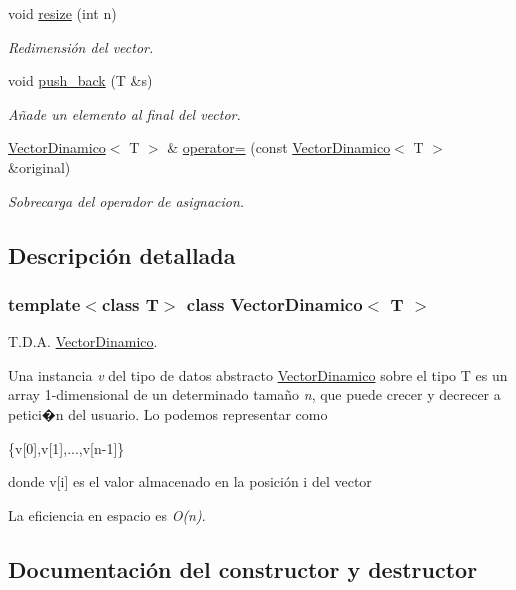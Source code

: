 \begin{DoxyCompactItemize}
void \hyperlink{classVectorDinamico_a9b3fd8907bc3ca9b5bc5775bbb11f867}{resize} (int n)
\begin{DoxyCompactList}\small\item\em Redimensión del vector. \end{DoxyCompactList}\item 
void \hyperlink{classVectorDinamico_a2680351f2cd4feba8825c6f1f04a6392}{push\+\_\+back} (T \&s)
\begin{DoxyCompactList}\small\item\em Añade un elemento al final del vector. \end{DoxyCompactList}\item 
\hyperlink{classVectorDinamico}{Vector\+Dinamico}$<$ T $>$ \& \hyperlink{classVectorDinamico_a94727e698cadc2cf3e8482ce9620df87}{operator=} (const \hyperlink{classVectorDinamico}{Vector\+Dinamico}$<$ T $>$ \&original)
\begin{DoxyCompactList}\small\item\em Sobrecarga del operador de asignacion. \end{DoxyCompactList}\end{DoxyCompactItemize}


\subsection{Descripción detallada}
\subsubsection*{template$<$class T$>$\newline
class Vector\+Dinamico$<$ T $>$}

T.\+D.\+A. \hyperlink{classVectorDinamico}{Vector\+Dinamico}. 

Una instancia {\itshape v} del tipo de datos abstracto {\ttfamily \hyperlink{classVectorDinamico}{Vector\+Dinamico}} sobre el tipo {\ttfamily T} es un array 1-\/dimensional de un determinado tamaño {\itshape n}, que puede crecer y decrecer a petici�n del usuario. Lo podemos representar como

\{v\mbox{[}0\mbox{]},v\mbox{[}1\mbox{]},...,v\mbox{[}n-\/1\mbox{]}\}

donde v\mbox{[}i\mbox{]} es el valor almacenado en la posición i del vector

La eficiencia en espacio es {\itshape O(n)}. 

\subsection{Documentación del constructor y destructor}
\mbox{\label{classVectorDinamico_ad1d9b40e76d3ac449e99da4290e08924}} 
